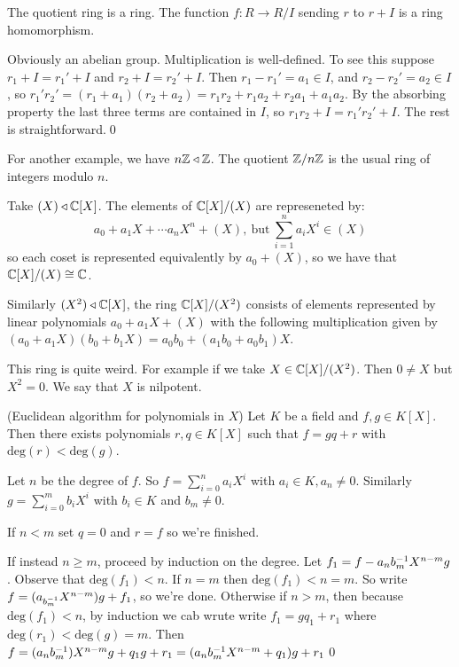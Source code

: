 \documentclass{article}
\newcommand{\nrm}{\triangleleft}
\begin{document}
\begin{proposition}
  The quotient ring is a ring. The function $ f:R\to R/I $ sending $ r $ to $ r+ I $ is a ring homomorphism.
\end{proposition}
\pf Obviously an abelian group. Multiplication is well-defined. To see this suppose $ r_1+I=r_1'+I $ and $ r_2+I=r_2'+I $. Then $ r_1-r_1'=a_1\in I $, and $ r_2-r_2'=a_2\in I $, so $ r_1'r_2'=(r_1+a_1)(r_2+a_2)=r_1r_2+r_1a_2+r_2a_1+a_1a_2 $. By the absorbing property the last three terms are contained in $ I $, so $ r_1r_2+ I=r_1'r_2'+I $. The rest is straightforward.\qed\par
For another example, we have $ n\Z\nrm\Z $. The quotient $ \mathbb{Z}/n\mathbb{Z} $ is the usual ring of integers modulo $ n $.\par
Take $ (X)\nrm \C[X] $. The elements of $ \mathbb{C}[X]/(X) $ are represeneted by:
\[
	a_0+a_1X+\cdots a_n X^n+(X),\  \text{but} \ \sum_{i=1}^na_iX^i\in (X)
\]
so each coset is represented equivalently by $ a_0+(X) $, so we have that $ \mathbb{C}[X]/(X)\cong \mathbb{C} $.\par
Similarly $ (X^2)\nrm \C[X] $, the ring $ \mathbb{C}[X]/(X^2) $ consists of elements represented by linear polynomials $ a_0+a_1X+(X) $ with the following multiplication given by $ (a_0+a_1X)(b_0+b_1X)=a_0b_0+(a_1b_0+a_0b_1)X $.\par
This ring is quite weird. For example if we take $ X\in \mathbb{C}[X]/(X^2) $. Then $ 0\ne X $ but $ X^2=0 $. We say that $ X $ is nilpotent.

\begin{proposition}
	(Euclidean algorithm for polynomials in $ X $) Let $ K $ be a field and $ f,g\in K[X] $. Then there exists polynomials $ r,q\in K[X] $ such that $ f=gq+r $ with $ \mathrm{deg}(r)<\mathrm{deg}(g) $.
\end{proposition}
\pf Let $ n $ be the degree of $ f $. So $ f=\sum_{i=0}^na_iX^i $ with $ a_i\in K,a_n\ne 0 $. Similarly $ g=\sum_{i=0}^mb_iX^i $ with $ b_i\in K $ and $ b_m\ne 0 $.\par
If $ n< m $ set $ q=0 $ and $ r=f $ so we're finished.\par
If instead $ n\ge m $, proceed by induction on the degree. Let $ f_1=f-a_n{b}^{-1}_mX^{n-m}g $. Observe that $ \mathrm{deg}(f_1)<n $. If $ n=m $ then $ \mathrm{deg}(f_1)<n=m $. So write $ f=(a_{{b}^{-1}_m}X^{n-m})g+f_1 $, so we're done. Otherwise if $ n>m $, then because $ \mathrm{deg}(f_1)<n $, by induction we cab wrute write $ f_1=gq_1+r_1 $ where $ \mathrm{deg}(r_1)<\mathrm{deg}(g)=m $. Then $ f=(a_n{b}^{-1}_m)X^{n-m}g+q_1g+r_1=(a_n{b}^{-1}_mX^{n-m}+q_1)g+r_1 $\qed
\end{document}
